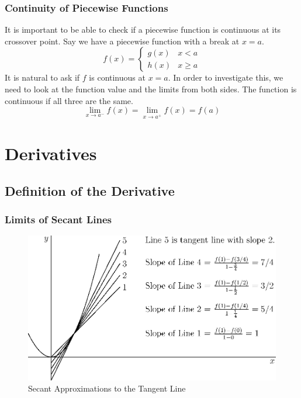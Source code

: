 \documentclass[fleqn]{report}
\begin{document}
\subsection{Continuity of Piecewise Functions}
\label{piecewise-continuity}

It is important to be able to check if a piecewise function is
continuous at its crossover point. Say we have a piecewise
function with a break at $x=a$.
\begin{equation*}
f(x) = \left\{ \begin{matrix} g(x) & x < a \\ h(x) & x \geq a
\end{matrix} \right.
\end{equation*}
It is natural to ask if $f$ is continuous at $x=a$. In order
to investigate this, we need to look at the function value and
the limits from both sides. The function is continuous if all
three are the same.
\begin{equation*}
\lim_{x \rightarrow a^-} f(x) = 
\lim_{x \rightarrow a^+} f(x) = f(a)
\end{equation*}

\chapter{Derivatives}
\label{derivatives}

\section{Definition of the Derivative}
\label{derivative-definition}

\subsection{Limits of Secant Lines}
\label{secant-lines}

\begin{figure}[ht]
\centering
\includegraphics{figure13.eps}
\caption{Secant Approximations to the Tangent Line}
\label{figure-secant-approximations2}
\end{figure}
\end{document}
